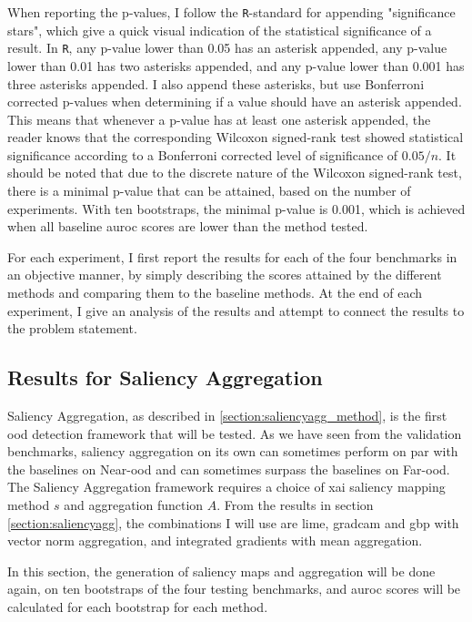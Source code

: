\documentclass[UKenglish]{uiomasterthesis} %
\theoremstyle{definition}
\begin{document}
When reporting the p-values, I follow the \texttt{R}-standard for appending "significance stars", which give a quick visual indication of the statistical significance of a result. In \texttt{R}, any p-value lower than 0.05 has an asterisk appended, any p-value lower than 0.01 has two asterisks appended, and any p-value lower than 0.001 has three asterisks appended. I also append these asterisks, but use Bonferroni corrected p-values when determining if a value should have an asterisk appended. This means that whenever a p-value has at least one asterisk appended, the reader knows that the corresponding Wilcoxon signed-rank test showed statistical significance according to a Bonferroni corrected level of significance of $0.05 / n$. It should be noted that due to the discrete nature of the Wilcoxon signed-rank test, there is a minimal p-value that can be attained, based on the number of experiments. With ten bootstraps, the minimal p-value is 0.001, which is achieved when all baseline \ac{auroc} scores are lower than the method tested.

For each experiment, I first report the results for each of the four benchmarks in an objective manner, by simply describing the scores attained by the different methods and comparing them to the baseline methods. At the end of each experiment, I give an analysis of the results and attempt to connect the results to the problem statement.

\subsection{Results for Saliency Aggregation} \label{section:salagg_results}

Saliency Aggregation, as described in \ref{section:saliencyagg_method}, is the first \ac{ood} detection framework that will be tested. As we have seen from the validation benchmarks, saliency aggregation on its own can sometimes perform on par with the baselines on Near-\ac{ood} and can sometimes surpass the baselines on Far-\ac{ood}. The Saliency Aggregation framework requires a choice of \ac{xai} saliency mapping method $s$ and aggregation function $A$. From the results in section \ref{section:saliencyagg}, the combinations I will use are \ac{lime}, \ac{gradcam} and \ac{gbp} with vector norm aggregation, and integrated gradients with mean aggregation.

In this section, the generation of saliency maps and aggregation will be done again, on ten bootstraps of the four testing benchmarks, and \ac{auroc} scores will be calculated for each bootstrap for each method.
\end{document}
